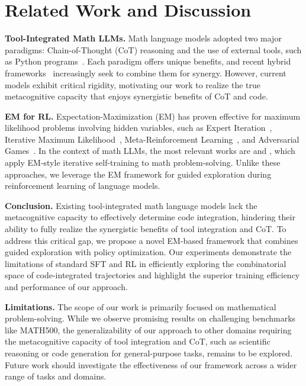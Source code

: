 \section{Related Work and Discussion}
\textbf{Tool-Integrated Math LLMs.} 
Math language models adopted two major paradigms: Chain-of-Thought (CoT) reasoning and the use of external tools, such as Python programs~\citep{metamath, mammoth, openmath}. Each paradigm offers unique benefits, and recent hybrid frameworks~\citep{mammoth, tora, htl, dsmath, qwen25} increasingly seek to combine them for synergy. However, current models exhibit critical rigidity, motivating our work to realize the true metacognitive capacity that enjoys synergistic benefits of CoT and code. 

\noindent\textbf{EM for RL.} Expectation-Maximization (EM) has proven effective for maximum likelihood problems involving hidden variables, such as Expert Iteration~\citep{expertiter}, Iterative Maximum Likelihood~\citep{iml, iml1}, Meta-Reinforcement Learning~\citep{varibad, vem}, and Adversarial Games~\citep{acb}. In the context of math LLMs, the most relevant works are \citep{restem} and \citep{iml2}, which apply EM-style iterative self-training to math problem-solving. Unlike these approaches, we leverage the EM framework for guided exploration during reinforcement learning of language models.

\noindent\textbf{Conclusion.} Existing tool-integrated math language models lack the metacognitive capacity to effectively determine code integration, hindering their ability to fully realize the synergistic benefits of tool integration and CoT.  To address this critical gap, we propose a novel EM-based framework that combines guided exploration with policy optimization.  Our experiments demonstrate the limitations of standard SFT and RL in efficiently exploring the combinatorial space of code-integrated trajectories and highlight the superior training efficiency and performance of our approach.

\clearpage

\noindent\textbf{Limitations.} 
The scope of our work is primarily focused on mathematical problem-solving.  While we observe promising results on challenging benchmarks like MATH500, the generalizability of our approach to other domains requiring the metacognitive capacity of tool integration and CoT, such as scientific reasoning or code generation for general-purpose tasks, remains to be explored.  Future work should investigate the effectiveness of our framework across a wider range of tasks and domains.

